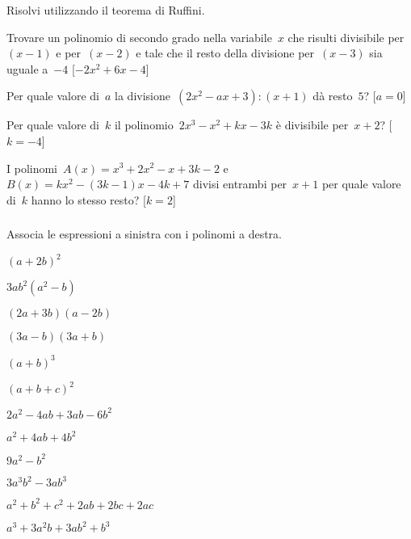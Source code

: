 \begin{esercizio}[\Ast]
\label{ese:div.007}
Risolvi utilizzando il teorema di Ruffini.
 \begin{enumeratea}
 \item Trovare un polinomio di secondo grado nella variabile~$x$ che risulti 
  divisibile per~$(x-1)$ e per~$(x-2)$ e tale che il resto della divisione 
  per~$(x-3)$ sia uguale a~$-4$ \hfill[$-2x^2+6x-4$]
 \item Per quale valore di~$a$ la 
  divisione~$\left(2x^{2}-ax+3\right):(x+1)$ dà resto~$5$? \hfill[$a=0$]
 \item Per quale valore di~$k$ il 
  polinomio~$2x^{3}-x^{2}+kx-3k$ è divisibile per~$x+2$? \hfill[$k=-4$]
 \item I polinomi~$A(x)=x^3+2x^2-x+3k-2$ e~$B(x)=kx^2-(3k-1)x-4k+7$ 
  divisi entrambi per~$x+1$ per quale valore di~$k$ hanno lo stesso resto? 
  \hfill[$k=2$]
 \end{enumeratea}
\end{esercizio}

\subsubsection*{}

\begin{esercizio}
\label{ese:div.008}
Associa le espressioni a sinistra con i polinomi a destra.
  \begin{multicols}{2}
\begin{enumeratea}
\item $(a+2b)^{2}$
\item $3ab^{2}(a^{2}-b)$
\item $(2a+3b)(a-2b)$
\item $(3a-b)(3a+b)$
\item $(a+b)^{3}$
\item $(a+b+c)^{2}$
\item $2a^{2}-4ab+3ab-6b^{2}$
\item $a^{2}+4ab+4b^{2}$
\item $9a^{2}-b^{2}$
\item $3a^{3}b^{2}-3ab^{3}$
\item $a^{2}+b^{2}+c^{2}+2ab+2bc+2ac$
\item $a^{3}+3a^{2}b+3ab^{2}+b^{3}$
\end{enumeratea}
  \end{multicols}
\end{esercizio}

